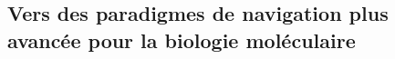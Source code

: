 {%



\subsection*{Vers des paradigmes de navigation plus avancée pour la biologie moléculaire}


}
